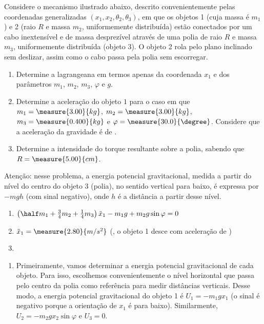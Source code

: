 \begin{question}
	Considere o mecanismo ilustrado abaixo, descrito convenientemente pelas coordenadas generalizadas $(x_1, x_2, \theta_2, \theta_3)$, em que os objetos 1 (cuja massa é $m_1$) e 2 (raio $R$ e massa $m_2$, uniformemente distribuída) estão conectados por um cabo inextensível e de massa desprezível através de uma polia de raio $R$ e massa $m_3$, uniformemente distribuída (objeto 3).
	O objeto 2 rola pelo plano inclinado sem deslizar, assim como o cabo passa pela polia sem escorregar.

	\begin{enumerate}
		\item Determine a lagrangeana em termos apenas da coordenada $x_1$ e dos parâmetros $m_1$, $m_2$, $m_3$, $\varphi$ e $g$.
		\item Determine a aceleração do objeto $1$ para o caso em que $m_1 = \measure{3.00}{kg}$, $m_2 = \measure{3.00}{kg}$, $m_3 = \measure{0.400}{kg}$ e $\varphi = \measure{30.0}{\degree}$.
		Considere que a aceleração da gravidade é de .
		\item Determine a intensidade do torque resultante sobre a polia, sabendo que $R = \measure{5.00}{cm}$.
	\end{enumerate}


	\begin{compactdesc}
		\item[Atenção:] nesse problema, a energia potencial gravitacional, medida a partir do nível do centro do objeto 3 (polia), no sentido vertical para baixo, é expressa por $-mgh$ (com sinal negativo), onde $h$ é a distância a partir desse nível.
	\end{compactdesc}

	\begin{answer}
		\begin{enumerate}
			\item $\left(\half m_1 + \frac{3}{4}m_2 + \frac{1}{4}m_3\right)\ddot x_1 - m_1 g + m_2 g \sin \varphi = 0$
			\item $\ddot x_1 = \measure{2.80}{m/s^2}$ (\ie, o objeto 1 desce com aceleração de )
			\item {}
		\end{enumerate}
	\end{answer}


	\begin{solution}
		\begin{enumerate}
			\item Primeiramente, vamos determinar a energia potencial gravitacional de cada objeto.
			Para isso, escolhemos convenientemente o nível horizontal que passa pelo centro da polia como referência para medir distâncias verticais.
			Desse modo, a energia potencial gravitacional do objeto 1 é $U_1 = -m_1gx_1$ (o sinal é negativo porque a orientação de $x_1$ é para baixo).
			Similarmente, $U_2 = -m_2gx_2\sin\varphi$ e $U_3 = 0$.


\end{enumerate}
\end{solution}
\end{question}

